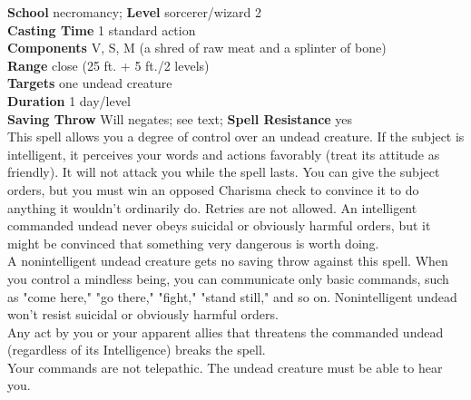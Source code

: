 \textbf{School} necromancy; \textbf{Level} sorcerer/wizard 2\\
\textbf{Casting Time} 1 standard action\\
\textbf{Components} V, S, M (a shred of raw meat and a splinter of bone)\\
\textbf{Range} close (25 ft. + 5 ft./2 levels)\\
\textbf{Targets} one undead creature\\
\textbf{Duration} 1 day/level\\
\textbf{Saving Throw }Will negates; see text; \textbf{Spell Resistance} yes\\
This spell allows you a degree of control over an undead creature. If the subject is intelligent, it perceives your words and actions favorably (treat its attitude as friendly). It will not attack you while the spell lasts. You can give the subject orders, but you must win an opposed Charisma check to convince it to do anything it wouldn't ordinarily do. Retries are not allowed. An intelligent commanded undead never obeys suicidal or obviously harmful orders, but it might be convinced that something very dangerous is worth doing.\\
A nonintelligent undead creature gets no saving throw against this spell. When you control a mindless being, you can communicate only basic commands, such as "come here," "go there," "fight," "stand still," and so on. Nonintelligent undead won't resist suicidal or obviously harmful orders.\\
Any act by you or your apparent allies that threatens the commanded undead (regardless of its Intelligence) breaks the spell.\\
Your commands are not telepathic. The undead creature must be able to hear you.\\
